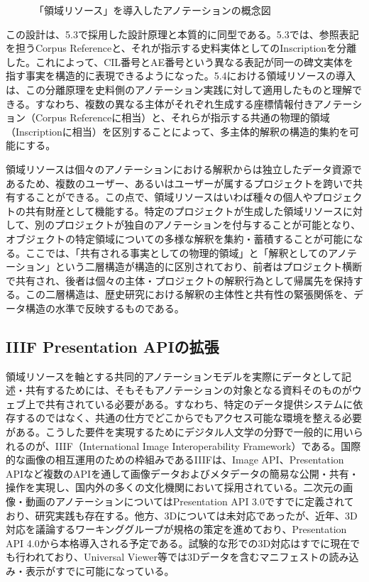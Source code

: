 \begin{figure}[htbp]
  \centering
  \caption{「領域リソース」を導入したアノテーションの概念図}
  \label{fig:ch5-region-resource}
\end{figure}

この設計は、5.3で採用した設計原理と本質的に同型である。5.3では、参照表記を担うCorpus Referenceと、それが指示する史料実体としてのInscriptionを分離した。これによって、CIL番号とAE番号という異なる表記が同一の碑文実体を指す事実を構造的に表現できるようになった。5.4における領域リソースの導入は、この分離原理を史料側のアノテーション実践に対して適用したものと理解できる。すなわち、複数の異なる主体がそれぞれ生成する座標情報付きアノテーション（Corpus Referenceに相当）と、それらが指示する共通の物理的領域（Inscriptionに相当）を区別することによって、多主体的解釈の構造的集約を可能にする。

領域リソースは個々のアノテーションにおける解釈からは独立したデータ資源であるため、複数のユーザー、あるいはユーザーが属するプロジェクトを跨いで共有することができる。この点で、領域リソースはいわば種々の個人やプロジェクトの共有財産として機能する。特定のプロジェクトが生成した領域リソースに対して、別のプロジェクトが独自のアノテーションを付与することが可能となり、オブジェクトの特定領域についての多様な解釈を集約・蓄積することが可能になる。ここでは、「共有される事実としての物理的領域」と「解釈としてのアノテーション」という二層構造が構造的に区別されており、前者はプロジェクト横断で共有され、後者は個々の主体・プロジェクトの解釈行為として帰属先を保持する。この二層構造は、歴史研究における解釈の主体性と共有性の緊張関係を、データ構造の水準で反映するものである。

\subsection{IIIF Presentation APIの拡張}

領域リソースを軸とする共同的アノテーションモデルを実際にデータとして記述・共有するためには、そもそもアノテーションの対象となる資料そのものがウェブ上で共有されている必要がある。すなわち、特定のデータ提供システムに依存するのではなく、共通の仕方でどこからでもアクセス可能な環境を整える必要がある。こうした要件を実現するためにデジタル人文学の分野で一般的に用いられるのが、IIIF（International Image Interoperability Framework）である。国際的な画像の相互運用のための枠組みであるIIIFは、Image API、Presentation APIなど複数のAPIを通して画像データおよびメタデータの簡易な公開・共有・操作を実現し、国内外の多くの文化機関において採用されている。二次元の画像・動画のアノテーションについてはPresentation API 3.0ですでに定義されており、研究実践も存在する。他方、3Dについては未対応であったが、近年、3D対応を議論するワーキンググループが規格の策定を進めており、Presentation API 4.0から本格導入される予定である。試験的な形での3D対応はすでに現在でも行われており、Universal Viewer等では3Dデータを含むマニフェストの読み込み・表示がすでに可能になっている。

